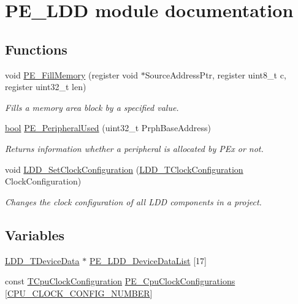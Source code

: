 \hypertarget{group___p_e___l_d_d__module}{}\section{P\+E\+\_\+\+L\+DD module documentation}
\label{group___p_e___l_d_d__module}
\subsection*{Functions}
\begin{DoxyCompactItemize}
\item 
void \hyperlink{group___p_e___l_d_d__module_ga6cb22864b71fd00f200c9fb3375f4e29}{P\+E\+\_\+\+Fill\+Memory} (register void $\ast$Source\+Address\+Ptr, register uint8\+\_\+t c, register uint32\+\_\+t len)
\begin{DoxyCompactList}\small\item\em Fills a memory area block by a specified value. \end{DoxyCompactList}\item 
\hyperlink{group___p_e___types__module_ga97a80ca1602ebf2303258971a2c938e2}{bool} \hyperlink{group___p_e___l_d_d__module_ga9e049b01a45212fe5b6a8476fe124b59}{P\+E\+\_\+\+Peripheral\+Used} (uint32\+\_\+t Prph\+Base\+Address)
\begin{DoxyCompactList}\small\item\em Returns information whether a peripheral is allocated by P\+Ex or not. \end{DoxyCompactList}\item 
void \hyperlink{group___p_e___l_d_d__module_ga7fe8a131453ba765c5e85130a282eafb}{L\+D\+D\+\_\+\+Set\+Clock\+Configuration} (\hyperlink{group___p_e___types__module_ga369bcaf7f00caad5f994c72ac2629a37}{L\+D\+D\+\_\+\+T\+Clock\+Configuration} Clock\+Configuration)
\begin{DoxyCompactList}\small\item\em Changes the clock configuration of all L\+DD components in a project. \end{DoxyCompactList}\end{DoxyCompactItemize}
\subsection*{Variables}
\begin{DoxyCompactItemize}
\item 
\hyperlink{group___p_e___types__module_gac5cf1362f1f0e3a2ce71b1bf2276d091}{L\+D\+D\+\_\+\+T\+Device\+Data} $\ast$ \hyperlink{group___p_e___l_d_d__module_gad5cf9320092cdbfaf70c3eac78567de5}{P\+E\+\_\+\+L\+D\+D\+\_\+\+Device\+Data\+List} \mbox{[}17\mbox{]}
\item 
const \hyperlink{struct_t_cpu_clock_configuration}{T\+Cpu\+Clock\+Configuration} \hyperlink{group___p_e___l_d_d__module_gab69281f0e90d16198a5595ed7f471441}{P\+E\+\_\+\+Cpu\+Clock\+Configurations} \mbox{[}\hyperlink{group___cpu__module_ga37d43e31f65dd620040aec363e95b5a8}{C\+P\+U\+\_\+\+C\+L\+O\+C\+K\+\_\+\+C\+O\+N\+F\+I\+G\+\_\+\+N\+U\+M\+B\+ER}\mbox{]}
\end{DoxyCompactItemize}


